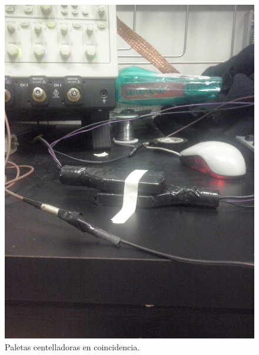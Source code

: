 \documentclass[a4paper,10pt]{article}
\numberwithin{equation}{section}
\begin{document}
\newpage

\appendix
\appendixpage

\begin{figure}[H]
 \center 
 \includegraphics[scale=0.1]{Imagenes/paletas}
 \caption{Paletas centelladoras en coincidencia.}
\end{figure}
\end{document}
